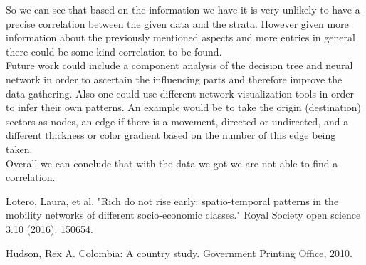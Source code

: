 \documentclass[runningheads]{llncs}
\begin{document}
	So we can see that based on the information we have it is very unlikely to have a precise correlation between the given data and the strata. However given more information about the previously mentioned aspects and more entries in general there could be some kind correlation to be found.\\
	Future work could include a component analysis of the decision tree and neural network in order to ascertain the influencing parts and therefore improve the data gathering. Also one could use different network visualization tools in order to infer their own patterns. An example would be to take the origin (destination) sectors as nodes, an edge if there is a movement, directed or undirected, and a different thickness or color gradient based on the number of this edge being taken.\\
	
	Overall we can conclude that with the data we got we are not able to find a correlation.
	
	
	\begin{thebibliography}{8}
		Lotero, Laura, et al. "Rich do not rise early: spatio-temporal patterns in the mobility networks of different socio-economic classes." Royal Society open science 3.10 (2016): 150654.
		
		Hudson, Rex A. Colombia: A country study. Government Printing Office, 2010.
		
	\end{thebibliography}
\end{document}
